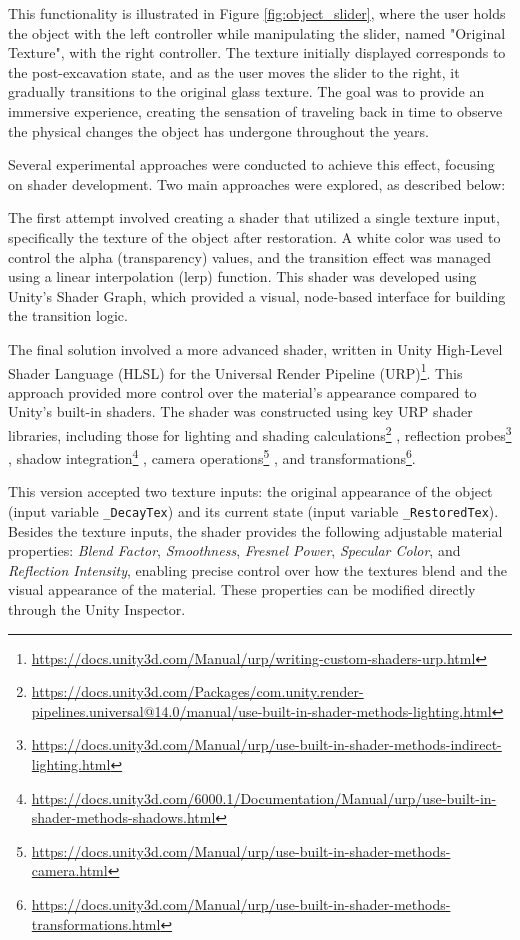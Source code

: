 This functionality is illustrated in Figure \ref{fig:object_slider}, where the user holds the object with the left controller while manipulating the slider, named "Original Texture", with the right controller. 
The texture initially displayed corresponds to the post-excavation state, and as the user moves the slider to the right, it gradually transitions to the original glass texture.
The goal was to provide an immersive experience, creating the sensation of traveling back in time to observe the physical changes the object has undergone throughout the years.

Several experimental approaches were conducted to achieve this effect, focusing on shader development.
Two main approaches were explored, as described below:

The first attempt involved creating a shader that utilized a single texture input, specifically the texture of the object after restoration. A white color was used to control the alpha (transparency) values, and the transition effect was managed using a linear interpolation (lerp) function. This shader was developed using Unity’s Shader Graph, which provided a visual, node-based interface for building the transition logic.


The final solution involved a more advanced shader, written in Unity High-Level Shader Language (HLSL) for the Universal Render Pipeline (URP)\footnote{\url{https://docs.unity3d.com/Manual/urp/writing-custom-shaders-urp.html}}. 
This approach provided more control over the material's appearance compared to Unity's built-in shaders.
The shader was constructed using key URP shader libraries, including those for lighting and shading calculations\footnote{\url{https://docs.unity3d.com/Packages/com.unity.render-pipelines.universal@14.0/manual/use-built-in-shader-methods-lighting.html}}
, reflection probes\footnote{\url{https://docs.unity3d.com/Manual/urp/use-built-in-shader-methods-indirect-lighting.html}}
, shadow integration\footnote{\url{https://docs.unity3d.com/6000.1/Documentation/Manual/urp/use-built-in-shader-methods-shadows.html}}
, camera operations\footnote{\url{https://docs.unity3d.com/Manual/urp/use-built-in-shader-methods-camera.html}}
, and transformations\footnote{\url{https://docs.unity3d.com/Manual/urp/use-built-in-shader-methods-transformations.html}}.

This version accepted two texture inputs: the original appearance of the object (input variable \texttt{\_DecayTex}) and its current state (input variable \texttt{\_RestoredTex}).
Besides the texture inputs, the shader provides the following adjustable material properties: \emph{Blend Factor}, \emph{Smoothness}, \emph{Fresnel Power}, \emph{Specular Color}, and \emph{Reflection Intensity}, enabling precise control over how the textures blend and the visual appearance of the material. 
These properties can be modified directly through the Unity Inspector.

